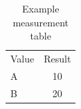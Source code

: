 \begin{table}[h]
    \centering
    \caption{Example measurement table}
    \label{tab:measurement}
    \begin{tabular}{l c}
        Value & Result \\
        A & 10 \\
        B & 20
    \end{tabular}
\end{table}